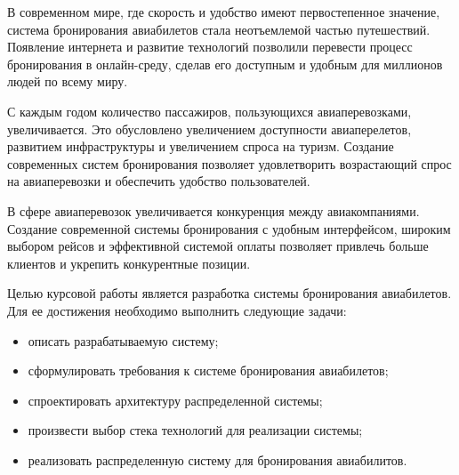 \maketableofcontents

\intro


В современном мире, где скорость и удобство имеют первостепенное значение, система бронирования авиабилетов стала неотъемлемой частью путешествий. Появление интернета и развитие технологий позволили перевести процесс бронирования в онлайн-среду, сделав его доступным и удобным для миллионов людей по всему миру. 

С каждым годом количество пассажиров, пользующихся авиаперевозками, увеличивается. Это обусловлено увеличением доступности авиаперелетов, развитием инфраструктуры и увеличением спроса на туризм. Создание современных систем бронирования позволяет удовлетворить возрастающий спрос на авиаперевозки и обеспечить удобство пользователей.

В сфере авиаперевозок увеличивается конкуренция между авиакомпаниями. Создание современной системы бронирования с удобным интерфейсом, широким выбором рейсов и эффективной системой оплаты позволяет привлечь больше клиентов и укрепить конкурентные позиции.

Целью курсовой работы является разработка системы бронирования авиабилетов. Для ее достижения необходимо выполнить следующие задачи:

\begin{itemize}
  \item описать разрабатываемую систему;
  \item сформулировать требования к системе бронирования авиабилетов;
  \item спроектировать архитектуру распределенной системы;
  \item произвести выбор стека технологий для реализации системы;
  \item реализовать распределенную систему для бронирования авиабилитов.
\end{itemize}
